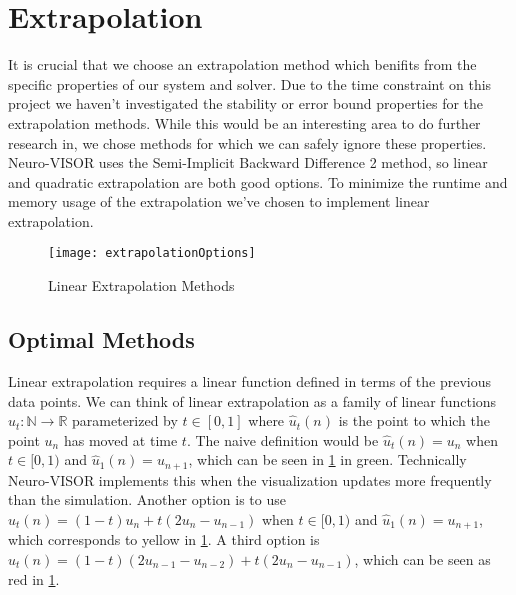 
\section{Extrapolation}%
\label{sec:extrapolation}

It is crucial that we choose an extrapolation method which benifits from the specific properties of our system and solver.
Due to the time constraint on this project we haven't investigated the stability or error bound properties for the extrapolation methods.
While this would be an interesting area to do further research in, we chose methods for which we can safely ignore these properties.
Neuro-VISOR uses the Semi-Implicit Backward Difference 2 method\cite{neuroVISOR}, so linear and quadratic extrapolation are both good options.
To minimize the runtime and memory usage of the extrapolation we've chosen to implement linear extrapolation.

\begin{figure}[H]
    \centering
    \texttt{[image: extrapolationOptions]}
    \caption{Linear Extrapolation Methods}%
    \label{fig:extrapMethods}
\end{figure}

\subsection{Optimal Methods}%
\label{sub:optimal_methods}

Linear extrapolation requires a linear function defined in terms of the previous data points.
We can think of linear extrapolation as a family of linear functions $\hat{u}_t : \mathbb{N} \to \mathbb{R}$ parameterized by $t \in [0,1]$ where $\hat{u}_t(n)$ is the point to which the point $u_n$ has moved at time $t$.
The naive definition would be $\hat{u}_t(n) = u_n$ when $t \in [0,1)$ and $\hat{u}_1(n) = u_{n+1}$, which can be seen in \cref{fig:extrapMethods} in green.
Technically Neuro-VISOR implements this when the visualization updates more frequently than the simulation.
Another option is to use $\hat{u}_t(n) = (1-t)u_n + t(2u_n - u_{n-1})$ when $t \in [0,1)$ and $\hat{u}_1(n) = u_{n+1}$, which corresponds to yellow in \cref{fig:extrapMethods}.
A third option is $\hat{u}_t(n) = (1-t)(2u_{n-1} - u_{n-2}) + t(2u_n - u_{n-1})$, which can be seen as red in \cref{fig:extrapMethods}.

